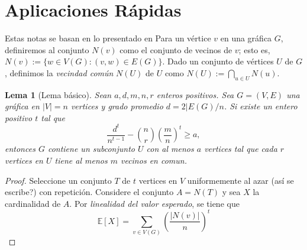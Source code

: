 \documentclass[12pt]{article}
\newcommand{\E}{\mathbb{E}}
\newtheorem{lema}[section]{Lema}
\begin{document}
\section*{Aplicaciones Rápidas}
Estas notas se basan en lo presentado en %
Para un vértice $v$ en una gráfica $G$, definiremos al conjunto $N(v)$ como el
conjunto de vecinos de $v$; esto es, $N(v) := \{w \in V(G): (v, w) \in E(G)\}$.
Dado un conjunto de vértices $U$ de $G$, definimos la \textit{vecindad común}
$N(U)$ de $U$ como $N(U) := \bigcap_{u \in U} N(u)$.  
\begin{lema}[Lema básico]
    Sean $a, d, m, n, r$ enteros positivos. Sea $G = (V, E)$ una gráfica en
    $\vert V \vert = n$ vertices y grado promedio $d = 2 \vert E(G) /n$. Si existe un entero positivo $t$ tal que 
    $$\frac{d^t}{n^{t-1}} - \binom{n}{r} \left(\frac{m}{n}\right)^t \ge a,$$
    entonces $G$ contiene un subconjunto $U$ con al menos $a$ vertices tal que cada $r$ vertices en $U$ tiene al menos $m$ vecinos en comun.
\end{lema}
\begin{proof}
    Seleccione un conjunto $T$ de $t$ vertices en $V$ uniformemente al azar (así se escribe?) con repetición. Considere el conjunto $A = N(T)$ y 
    sea $X$ la cardinalidad de $A$. Por \textit{linealidad del valor esperado}, se tiene que
    $$\E[X] = \sum_{v \in V(G)} \left( \frac{\vert N(v) \vert}{n} \right)^t $$

\end{proof}
\end{document}
